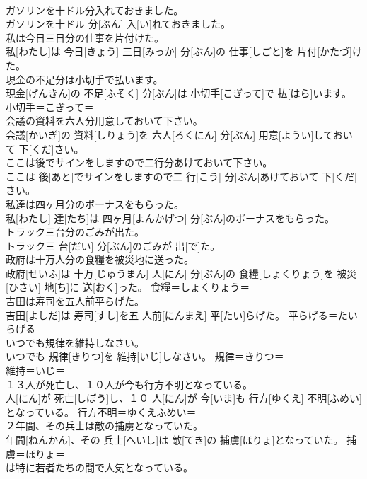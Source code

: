 \documentclass[8pt]{extreport}
\begin{document}
\begin{CJK}{UTF8}{min}
\\	ガソリンを十ドル分入れておきました。	
\\	ガソリンを十ドル 分[ぶん] 入[い]れておきました。	
\\	私は今日三日分の仕事を片付けた。	
\\	私[わたし]は 今日[きょう] 三日[みっか] 分[ぶん]の 仕事[しごと]を 片付[かたづ]けた。	
\\	現金の不足分は小切手で払います。	
\\	現金[げんきん]の 不足[ふそく] 分[ぶん]は 小切手[こぎって]で 払[はら]います。	小切手＝こぎって＝ 
\\	会議の資料を六人分用意しておいて下さい。	
\\	会議[かいぎ]の 資料[しりょう]を 六人[ろくにん] 分[ぶん] 用意[ようい]しておいて 下[くだ]さい。	
\\	ここは後でサインをしますので二行分あけておいて下さい。	
\\	ここは 後[あと]でサインをしますので二 行[こう] 分[ぶん]あけておいて 下[くだ]さい。	
\\	私達は四ヶ月分のボーナスをもらった。	
\\	私[わたし] 達[たち]は 四ヶ月[よんかげつ] 分[ぶん]のボーナスをもらった。	
\\	トラック三台分のごみが出た。	
\\	トラック三 台[だい] 分[ぶん]のごみが 出[で]た。	
\\	政府は十万人分の食糧を被災地に送った。	
\\	政府[せいふ]は 十万[じゅうまん] 人[にん] 分[ぶん]の 食糧[しょくりょう]を 被災[ひさい] 地[ち]に 送[おく]った。	食糧＝しょくりょう＝ 
\\	吉田は寿司を五人前平らげた。	
\\	吉田[よしだ]は 寿司[すし]を五 人前[にんまえ] 平[たい]らげた。	平らげる＝たいらげる＝ 
\\	いつでも規律を維持しなさい。	
\\	いつでも 規律[きりつ]を 維持[いじ]しなさい。	規律＝きりつ＝ 
\\	維持＝いじ＝ 
\\	１３人が死亡し、１０人が今も行方不明となっている。	
\\	人[にん]が 死亡[しぼう]し、１０ 人[にん]が 今[いま]も 行方[ゆくえ] 不明[ふめい]となっている。	行方不明＝ゆくえふめい＝ 
\\	２年間、その兵士は敵の捕虜となっていた。	
\\	年間[ねんかん]、その 兵士[へいし]は 敵[てき]の 捕虜[ほりょ]となっていた。	捕虜＝ほりょ＝ 
\\	は特に若者たちの間で人気となっている。	

\end{CJK}
\end{document}
